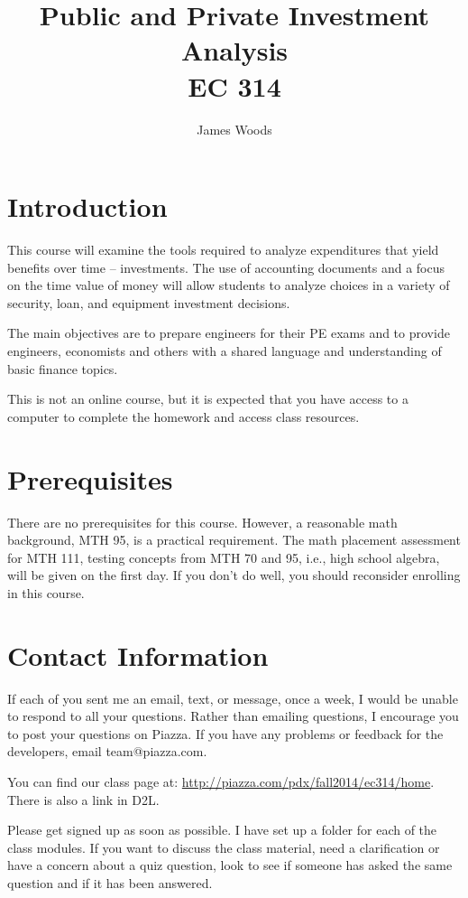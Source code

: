 \documentclass[letterpaper,10pt]{article}
\date{}
\title{Public and Private Investment Analysis\\ 
EC 314\\
\Term}
\author{James Woods}
\newcommand{\Piazza}{\url{http://piazza.com/pdx/fall2014/ec314/home}}
\begin{document}
\maketitle

\section{Introduction}

This course will examine the tools required to analyze expenditures
that yield benefits over time -- investments. The use of accounting
documents and a focus on the time value of money will allow students
to analyze choices in a variety of security, loan, and equipment
investment decisions.

The main objectives are to prepare engineers for their PE exams and to
provide engineers, economists and others with a shared language and
understanding of basic finance topics.

This is not an online course, but it is expected that you have access to a
computer to complete the homework and access class resources.  



\section{Prerequisites}

There are no prerequisites for this course. However, a reasonable math
background, MTH 95, is a practical requirement. The math placement assessment for MTH 111, testing concepts from MTH 70 and 95, i.e., high school algebra, will be given on the first day.  If you don't do well, you
should reconsider enrolling in this course.

\section{Contact Information}

If each of you sent me an email, text, or message, once a week, I would be unable to respond to all your questions.  Rather than emailing questions, I encourage you to post your questions on Piazza. If you have any problems or feedback for the developers, email team@piazza.com.

You can find our class page at: \Piazza.  There is also a link in D2L.

Please get signed up as soon as possible. I have set up a
folder for each of the class modules. If you want to discuss the class material, need a clarification or have a concern about a quiz question, look to see if someone has asked the same question and if it has been answered. 
\end{document}
